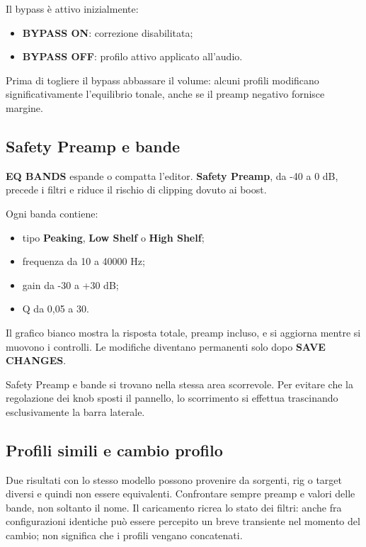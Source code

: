 \documentclass[11pt,a4paper]{article}
\newcommand{\control}[1]{\textbf{\textsf{#1}}}
\begin{document}
Il bypass è attivo inizialmente:

\begin{itemize}
  \item \control{BYPASS ON}: correzione disabilitata;
  \item \control{BYPASS OFF}: profilo attivo applicato all'audio.
\end{itemize}

Prima di togliere il bypass abbassare il volume: alcuni profili modificano
significativamente l'equilibrio tonale, anche se il preamp negativo fornisce
margine.

\subsection{Safety Preamp e bande}

\control{EQ BANDS} espande o compatta l'editor. \control{Safety Preamp}, da
-40 a 0 dB, precede i filtri e riduce il rischio di clipping dovuto ai boost.

Ogni banda contiene:

\begin{itemize}
  \item tipo \control{Peaking}, \control{Low Shelf} o \control{High Shelf};
  \item frequenza da 10 a 40000 Hz;
  \item gain da -30 a +30 dB;
  \item Q da 0,05 a 30.
\end{itemize}

Il grafico bianco mostra la risposta totale, preamp incluso, e si aggiorna
mentre si muovono i controlli. Le modifiche diventano permanenti solo dopo
\control{SAVE CHANGES}.

Safety Preamp e bande si trovano nella stessa area scorrevole. Per evitare che
la regolazione dei knob sposti il pannello, lo scorrimento si effettua
trascinando esclusivamente la barra laterale.

\subsection{Profili simili e cambio profilo}

Due risultati con lo stesso modello possono provenire da sorgenti, rig o target
diversi e quindi non essere equivalenti. Confrontare sempre preamp e valori
delle bande, non soltanto il nome. Il caricamento ricrea lo stato dei filtri:
anche fra configurazioni identiche può essere percepito un breve transiente nel
momento del cambio; non significa che i profili vengano concatenati.
\end{document}
